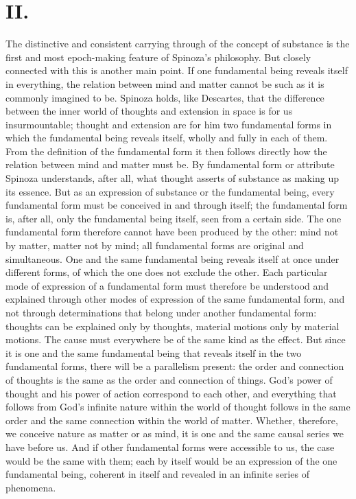 \documentclass[12pt]{book}
\newcommand{\opage}[1]{\marginnote{\footnotesize\textit{[#1]}}}
\begin{document}
\section*{II.}
\opage{89}The distinctive and consistent carrying through of the concept of substance is
the first and most epoch-making feature of Spinoza's philosophy. But closely connected
with this is another main point. If one fundamental being reveals itself in everything,
the relation between mind and matter cannot be such as it is commonly imagined to be.
Spinoza holds, like Descartes, that the difference between the inner world of thoughts
and extension in space is for us insurmountable; thought and extension are for him two
fundamental forms in which the fundamental being reveals itself, wholly and fully in
each of them. From the definition of the fundamental form it then follows directly how
the relation between mind and matter must be. By fundamental form or attribute Spinoza
understands, after all, what thought asserts of substance as making up its essence.
But as an expression of substance or the fundamental being, every fundamental form must
be conceived in and through itself; the fundamental form is, after all, only the
fundamental being itself, seen from a certain side. The one fundamental form therefore
cannot have been produced by the other: mind not by matter, matter not by mind; all
fundamental forms are original and simultaneous. One and the same fundamental being
reveals itself at once under different forms, of which the one does not exclude the
\opage{90}other. Each particular mode of expression of a fundamental form must therefore
be understood and explained through other modes of expression of the same fundamental
form, and not through determinations that belong under another fundamental form:
thoughts can be explained only by thoughts, material motions only by material motions.
The cause must everywhere be of the same kind as the effect. But since it is one and
the same fundamental being that reveals itself in the two fundamental forms, there will
be a parallelism present: the order and connection of thoughts is the same as the order
and connection of things. God's power of thought and his power of action correspond to
each other, and everything that follows from God's infinite nature within the world of
thought follows in the same order and the same connection within the world of matter.
Whether, therefore, we conceive nature as matter or as mind, it is one and the same
causal series we have before us. And if other fundamental forms were accessible to us,
the case would be the same with them; each by itself would be an expression of the one
fundamental being, coherent in itself and revealed in an infinite series of phenomena.
\end{document}
